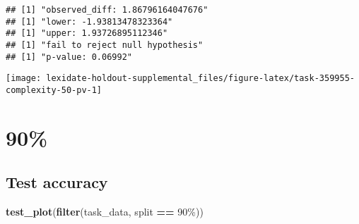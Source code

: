 \documentclass[
]{book}
\newenvironment{Shaded}{\begin{snugshade}}{\end{snugshade}}
\newcommand{\AttributeTok}[1]{\textcolor[rgb]{0.13,0.29,0.53}{#1}}
\newcommand{\DecValTok}[1]{\textcolor[rgb]{0.00,0.00,0.81}{#1}}
\newcommand{\FunctionTok}[1]{\textcolor[rgb]{0.13,0.29,0.53}{\textbf{#1}}}
\newcommand{\NormalTok}[1]{#1}
\newcommand{\OtherTok}[1]{\textcolor[rgb]{0.56,0.35,0.01}{#1}}
\newcommand{\SpecialCharTok}[1]{\textcolor[rgb]{0.81,0.36,0.00}{\textbf{#1}}}
\newcommand{\StringTok}[1]{\textcolor[rgb]{0.31,0.60,0.02}{#1}}
\begin{document}
\begin{Shaded}
\end{Shaded}

\begin{verbatim}
## [1] "observed_diff: 1.86796164047676"
## [1] "lower: -1.93813478323364"
## [1] "upper: 1.93726895112346"
## [1] "fail to reject null hypothesis"
## [1] "p-value: 0.06992"
\end{verbatim}

\texttt{[image: lexidate-holdout-supplemental\_files/figure-latex/task-359955-complexity-50-pv-1]}

\hypertarget{section-13}{%
\section{90\%}\label{section-13}}

\hypertarget{test-accuracy-13}{%
\subsection{Test accuracy}\label{test-accuracy-13}}

\begin{Shaded}
\begin{Highlighting}[]
\FunctionTok{test\_plot}\NormalTok{(}\FunctionTok{filter}\NormalTok{(task\_data, split }\SpecialCharTok{==} \StringTok{\textquotesingle{}90\%\textquotesingle{}}\NormalTok{))}
\end{Highlighting}
\end{Shaded}
\end{document}
